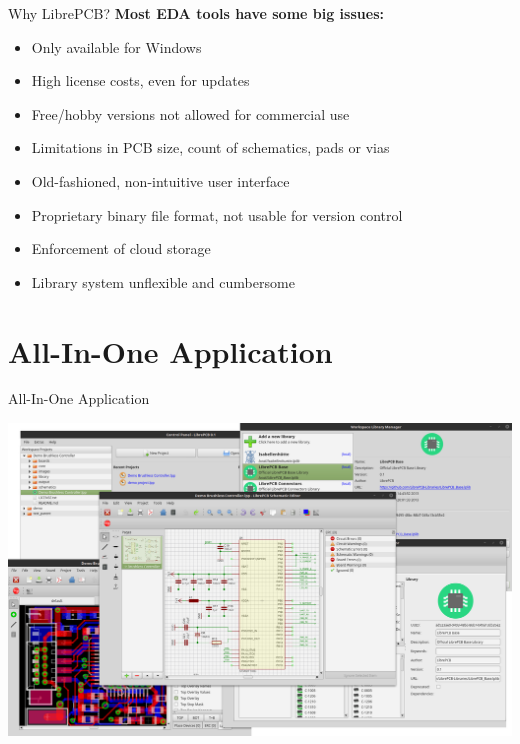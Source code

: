 \documentclass[aspectratio=1610,t]{beamer}
\begin{document}
\begin{frame}{Why LibrePCB?}
  \textbf{Most EDA tools have some big issues:}
  \begin{itemize}
   	\item Only available for Windows
    \item High license costs, even for updates
    \item Free/hobby versions not allowed for commercial use
    \item Limitations in PCB size, count of schematics, pads or vias
    \item Old-fashioned, non-intuitive user interface
    \item Proprietary binary file format, not usable for version control
    \item Enforcement of cloud storage
    \item Library system unflexible and cumbersome
  \end{itemize}
\end{frame}


\section{All-In-One Application}

\begin{frame}{All-In-One Application}
	\begin{center}
		\includegraphics[width=0.8\paperwidth]{images/overview.png}
	\end{center}
\end{frame}

\end{document}
